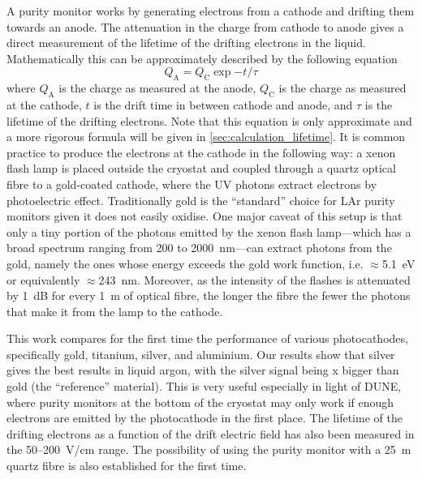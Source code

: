 \documentclass[a4paper,11pt]{article}
\begin{document}
A purity monitor works by generating electrons from a cathode and drifting them towards an anode. The attenuation in the charge from cathode to anode gives a direct measurement of the lifetime of the drifting electrons in the liquid. Mathematically this can be approximately described by the following equation 
\begin{equation}
    Q_\text{A} = Q_\text{C} \exp{-t/\tau}
\end{equation}
where $Q_\text{A}$ is the charge as measured at the anode, $Q_\text{C}$ is the charge as measured at the cathode, $t$ is the drift time in between cathode and anode, and $\tau$ is the lifetime of the drifting electrons. Note that this equation is only approximate and a more rigorous formula will be given in \ref{sec:calculation_lifetime}.
It is common practice to produce the electrons at the cathode in the following way: a xenon flash lamp is placed outside the cryostat and coupled through a quartz optical fibre to a gold-coated cathode, where the UV photons extract electrons by photoelectric effect. Traditionally gold is the ``standard'' choice for LAr purity monitors given it does not easily oxidise.
One major caveat of this setup is that only a tiny portion of the photons emitted by the xenon flash lamp---which has a broad spectrum ranging from 200 to \SI{2000}{nm}---can extract photons from the gold, namely the ones whose energy exceeds the gold work function, i.e. $\approx$\SI{5.1}{\eV} or equivalently $\approx$\SI{243}{nm}. Moreover, as the intensity of the flashes is attenuated by \SI{1}{\dB} for every \SI{1}{m} of optical fibre, the longer the fibre the fewer the photons that make it from the lamp to the cathode. 

This work compares for the first time the performance of various photocathodes, specifically gold, titanium, silver, and aluminium. Our results show that silver gives the best results in liquid argon, with the silver signal being x bigger than gold (the ``reference'' material). This is very useful especially in light of DUNE, where purity monitors at the bottom of the cryostat may only work if enough electrons are emitted by the photocathode in the first place. The lifetime of the drifting electrons as a function of the drift electric field has also been measured in the 50--\SI{200}{V/cm} range. %
The possibility of using the purity monitor with a \SI{25}{m} quartz fibre is also established for the first time.  
\end{document}
